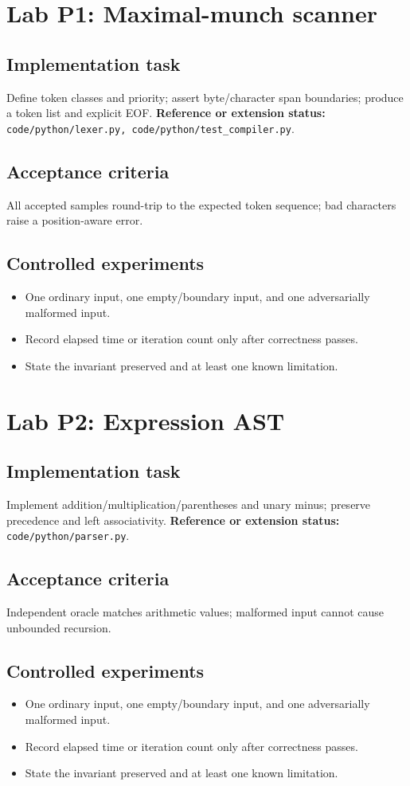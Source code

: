 \documentclass[10pt,letterpaper]{article}
\begin{document}
\section{Lab P1: Maximal-munch scanner}
\subsection{Implementation task}
Define token classes and priority; assert byte/character span boundaries; produce a token list and explicit EOF.
\textbf{Reference or extension status:} \texttt{code/python/lexer.py, code/python/test\_compiler.py}.\par\subsection{Acceptance criteria}
All accepted samples round-trip to the expected token sequence; bad characters raise a position-aware error.
\subsection{Controlled experiments}
\begin{itemize}
\item One ordinary input, one empty/boundary input, and one adversarially malformed input.
\item Record elapsed time or iteration count only after correctness passes.
\item State the invariant preserved and at least one known limitation.
\end{itemize}


\section{Lab P2: Expression AST}
\subsection{Implementation task}
Implement addition/multiplication/parentheses and unary minus; preserve precedence and left associativity.
\textbf{Reference or extension status:} \texttt{code/python/parser.py}.\par\subsection{Acceptance criteria}
Independent oracle matches arithmetic values; malformed input cannot cause unbounded recursion.
\subsection{Controlled experiments}
\begin{itemize}
\item One ordinary input, one empty/boundary input, and one adversarially malformed input.
\item Record elapsed time or iteration count only after correctness passes.
\item State the invariant preserved and at least one known limitation.
\end{itemize}
\end{document}
